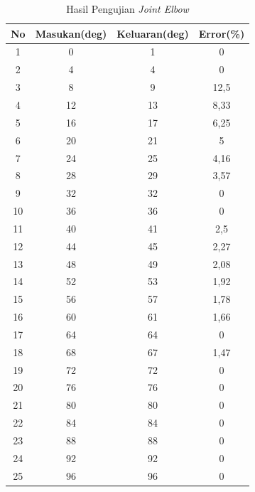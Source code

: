  \begin{table}[]
 	
 	\small
 	\centering
 	\caption{Hasil Pengujian \textit{Joint Elbow}}
 	\label{tbl.jointelbow}
 	\begin{tabular}{|c|c|c|c|}
 		\hline
 		\rowcolor[HTML]{9B9B9B} 
 		No & Masukan(deg) & Keluaran(deg) & Error(\%)      \\ \hline
 		1  & 0       & 1        & 0           \\ \hline
 		2  & 4       & 4        & 0           \\ \hline
 		3  & 8       & 9        & 12,5        \\ \hline
 		4  & 12      & 13       & 8,33 \\ \hline
 		5  & 16      & 17       & 6,25        \\ \hline
 		6  & 20      & 21       & 5           \\ \hline
 		7  & 24      & 25       & 4,16 \\ \hline
 		8  & 28      & 29       & 3,57 \\ \hline
 		9  & 32      & 32       & 0           \\ \hline
 		10 & 36      & 36       & 0           \\ \hline
 		11 & 40      & 41       & 2,5         \\ \hline
 		12 & 44      & 45       & 2,27 \\ \hline
 		13 & 48      & 49       & 2,08 \\ \hline
 		14 & 52      & 53       & 1,92 \\ \hline
 		15 & 56      & 57       & 1,78 \\ \hline
 		16 & 60      & 61       & 1,66 \\ \hline
 		17 & 64      & 64       & 0           \\ \hline
 		18 & 68      & 67       & 1,47 \\ \hline
 		19 & 72      & 72       & 0           \\ \hline
 		20 & 76      & 76       & 0           \\ \hline
 		21 & 80      & 80       & 0           \\ \hline
 		22 & 84      & 84       & 0           \\ \hline
 		23 & 88      & 88       & 0           \\ \hline
 		24 & 92      & 92       & 0           \\ \hline
 		25 & 96      & 96       & 0           \\ \hline

\end{tabular}
\end{table}
